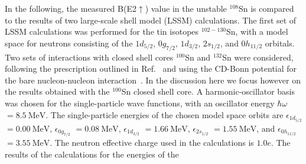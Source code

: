 \documentclass[prc,twocolumn,amssymb,amsmath,showpacs,superscriptaddress]{revtex4}
\begin{document}
In the following, the measured B(E2$\uparrow$) value in the
unstable $^{108}$Sn is compared to the results of two large-scale
shell model (LSSM) calculations. The first set of LSSM
calculations was performed for the tin isotopes $^{102-130}$Sn,
with a  model space for neutrons consisting of the $1d_{5/2}$,
$0g_{7/2}$, $1d_{3/2}$, $2s_{1/2}$, and $0h_{11/2}$ orbitals. Two
sets of interactions with closed shell cores $^{100}$Sn and
$^{132}$Sn were considered, following the prescription outlined in
Ref.~\cite{hjo95} and using the CD-Bonn potential for the bare
nucleon-nucleon interaction~\cite{mac96}. In the discussion here
we focus however on the results obtained with the $^{100}$Sn
closed shell core. A harmonic-oscillator basis was chosen for the
single-particle wave functions, with an oscillator energy
$\hbar\omega$ $= 8.5\ \text{MeV}$. The single-particle energies of
the chosen model space orbits are $\epsilon_{1d_{5/2}}$ $= 0.00\
\text{MeV}$, $\epsilon_{0g_{7/2}}$ $= 0.08\ \text{MeV}$,
$\epsilon_{1d_{3/2}}$ $= 1.66\ \text{MeV}$, $\epsilon_{2s_{1/2}}$
$ = 1.55\ \text{MeV}$, and $\epsilon_{0h_{11/2}}$ $= 3.55\
\text{MeV}$. The neutron effective charge used in the calculations
is $1.0e$. The results of the calculations for the energies of the
\end{document}
